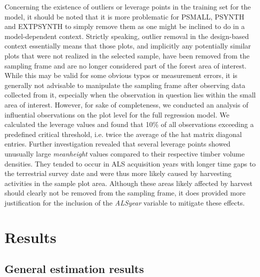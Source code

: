\documentclass[remotesensing,article,submit,moreauthors,pdftex,10pt,a4paper]{mdpi}
\newcommand{\psynth}{PSYNTH}
\newcommand{\psmall}{PSMALL}
\newcommand{\extpsynth}{EXTPSYNTH}
\newcommand{\meanheight}{\textit{meanheight}}
\newcommand{\alsyear}{\textit{ALSyear}}
\begin{document}




Concerning the existence of outliers or leverage points in the training set for the model, it should be noted that it is more problematic for \psmall{}, \psynth{} and \extpsynth{} to simply remove them as one might be inclined to do in a model-dependent context. Strictly speaking, outlier removal in the design-based context essentially means that those plots, and implicitly any potentially similar plots that were not realized in the selected sample, have been removed from the sampling frame and are no longer considered part of the forest area of interest. While this may be valid for some obvious typos or measurement errors, it is generally not advisable to manipulate the sampling frame after observing data collected from it, especially when the observation in question lies within the small area of interest. However, for sake of completeness, we conducted an analysis of influential observations \citep[pp. 160--167]{fahrmeir2013} on the plot level for the full regression model. We calculated the leverage values and found that 10\% of all observations exceeding a predefined critical threshold, i.e. twice the average of the hat matrix diagonal entries. Further investigation revealed that several leverage points showed unusually large \meanheight{} values compared to their respective timber volume densities. They tended to occur in ALS acquisition years with longer time gaps to the terrestrial survey date and were thus more likely caused by harvesting activities in the sample plot area.  Although these areas likely affected by harvest should clearly not be removed from the sampling frame, it does provided more justification for the inclusion of the \alsyear{} variable to mitigate these effects.



\section{Results}
\label{sec:Res}


\subsection{General estimation results}
\label{sec:feasest}
\end{document}
